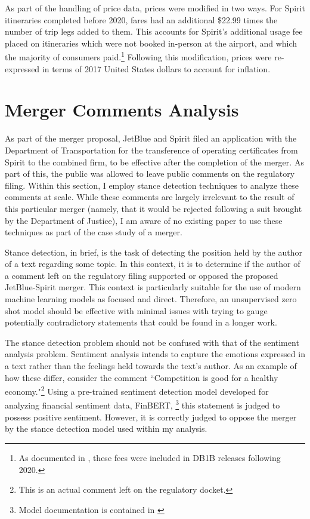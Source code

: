 \documentclass{article}
\begin{document}
\begin{appendices}
	
	As part of the handling of price data, prices were modified in two ways. For Spirit itineraries completed before 2020, fares had an additional \$22.99 times the number of trip legs added to them. This accounts for Spirit's additional usage fee placed on itineraries which were not booked in-person at the airport, and which the majority of consumers paid.\footnote{As documented in \citet{shrago_spirit_2024}, these fees were included in DB1B releases following 2020.} Following this modification, prices were re-expressed in terms of 2017 United States dollars to account for inflation.

    \FloatBarrier
	\section{Merger Comments Analysis}
	\label{sec:NaturalLanguage}

As part of the merger proposal, JetBlue and Spirit filed an application with the Department of Transportation for the transference of operating certificates from Spirit to the combined firm, to be effective after the completion of the merger. As part of this, the public was allowed to leave public comments on the regulatory filing. Within this section, I employ stance detection techniques to analyze these comments at scale. While these comments are largely irrelevant to the result of this particular merger (namely, that it would be rejected following a suit brought by the Department of Justice), I am aware of no existing paper to use these techniques as part of the case study of a merger. 

Stance detection, in brief, is the task of detecting the position held by the author of a text regarding some topic. In this context, it is to determine if the author of a comment left on the regulatory filing supported or opposed the proposed JetBlue-Spirit merger. This context is particularly suitable for the use of modern machine learning models as focused and direct. Therefore, an unsupervised zero shot model should be effective with minimal issues with trying to gauge potentially contradictory statements that could be found in a longer work. 

The stance detection problem should not be confused with that of the sentiment analysis problem. Sentiment analysis intends to capture the emotions expressed in a text rather than the feelings held towards the text's author. As an example of how these differ, consider the comment ``Competition is good for a healthy economy."\footnote{This is an actual comment left on the regulatory docket.} Using a pre-trained sentiment detection model developed for analyzing financial sentiment data, FinBERT, \footnote{Model documentation is contained in \citet{araci_finbert_2019}} this statement is judged to possess positive sentiment. However, it is correctly judged to oppose the merger by the stance detection model used within my analysis. 


\end{appendices}
\end{document}
